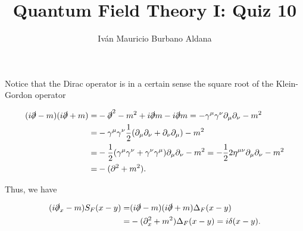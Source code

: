\documentclass{article}
\author{Iván Mauricio Burbano Aldana}
\title{Quantum Field Theory I: Quiz 10}
\begin{document}
\maketitle

Notice that the Dirac operator is in a certain sense the square root of the Klein-Gordon operator

\begin{equation}
\begin{aligned}
(i\slashed{\partial}-m)(i\slashed{\partial}+m)=&-\slashed{\partial}^2-m^2+i\slashed{\partial}m-i\slashed{\partial}m
=-\gamma^\mu\gamma^\nu\partial_{\mu}\partial_{\nu}-m^2\\
=&-\gamma^\mu\gamma^\nu\frac{1}{2}(\partial_{\mu}\partial_{\nu}+\partial_{\nu}\partial_{\mu})-m^2\\
=&-\frac{1}{2}(\gamma^\mu\gamma^\nu+\gamma^\nu\gamma^\mu)\partial_\mu\partial_\nu-m^2=-\frac{1}{2}2\eta^{\mu\nu}\partial_\mu\partial_\nu-m^2\\
=&-(\partial^2+m^2).
\end{aligned}
\end{equation}

Thus, we have

\begin{equation}
\begin{aligned}
(i\slashed{\partial}_x-m)S_F(x-y)=&(i\slashed{\partial}-m)(i\slashed{\partial}+m)\Delta_F(x-y)\\
=&-(\partial^2_x+m^2)\Delta_F(x-y)=i\delta(x-y).
\end{aligned}
\end{equation}
\end{document}
